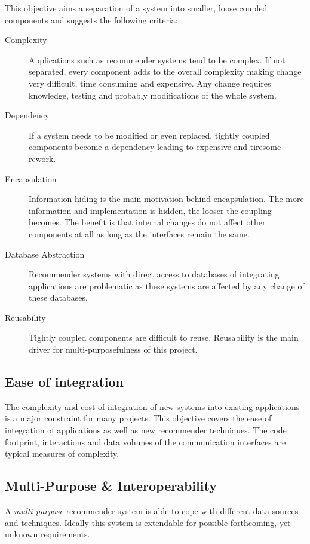 This objective aims a separation of a system into smaller, loose coupled components and suggests the following criteria:

\begin{description}
    \item[Complexity] Applications such as recommender systems tend to be complex. If not separated, every component adds to the overall complexity making change very difficult, time consuming and expensive. Any change requires knowledge, testing and probably modifications of the whole system.
    \item[Dependency] If a system needs to be modified or even replaced, tightly coupled components become a dependency leading to expensive and tiresome rework.
    \item[Encapsulation] Information hiding is the main motivation behind encapsulation. The more information and implementation is hidden, the looser the coupling becomes. The benefit is that internal changes do not affect other components at all as long as the interfaces remain the same.
    \item[Database Abstraction] Recommender systems with direct access to databases of integrating applications are problematic as these systems are affected by any change of these databases.
    \item[Reusability] Tightly coupled components are difficult to reuse. Reusability is the main driver for multi-purposefulness of this project.
\end{description}

\subsection{Ease of integration}
\label{intro-objectives-easeofintegration}

The complexity and cost of integration of new systems into existing applications is a major constraint for many projects. This objective covers the ease of integration of applications as well as new recommender techniques. The code footprint, interactions and data volumes of the communication interfaces are typical measures of complexity.

\subsection{Multi-Purpose \& Interoperability}
\label{intro-objectives-multipurpose}

A \emph{multi-purpose} recommender system is able to cope with different data sources and techniques. Ideally this system is extendable for possible forthcoming, yet unknown requirements.


